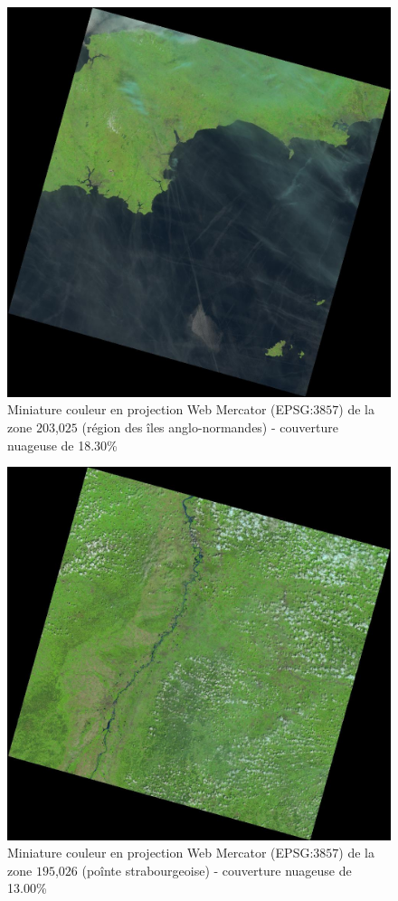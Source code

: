 \documentclass{book}
\begin{document}
\begin{figure}[H]
\begin{center}
\includegraphics[scale=0.2]{images/LC82030252013196LGN00.jpg}
\end{center}
\caption{Miniature couleur en projection Web Mercator (EPSG:$3857$) de la zone $203$,$025$ (région des îles anglo-normandes) - couverture nuageuse de 18.30\%}
\label{cloud3}
\end{figure}

\begin{figure}[H]
\begin{center}
\includegraphics[scale=0.2]{images/LC81950262013156LGN00.jpg}
\end{center}
\caption{Miniature couleur en projection Web Mercator (EPSG:$3857$) de la zone $195$,$026$ (poînte strabourgeoise) - couverture nuageuse de 13.00\%}
\label{cloud4}
\end{figure}
\end{document}
